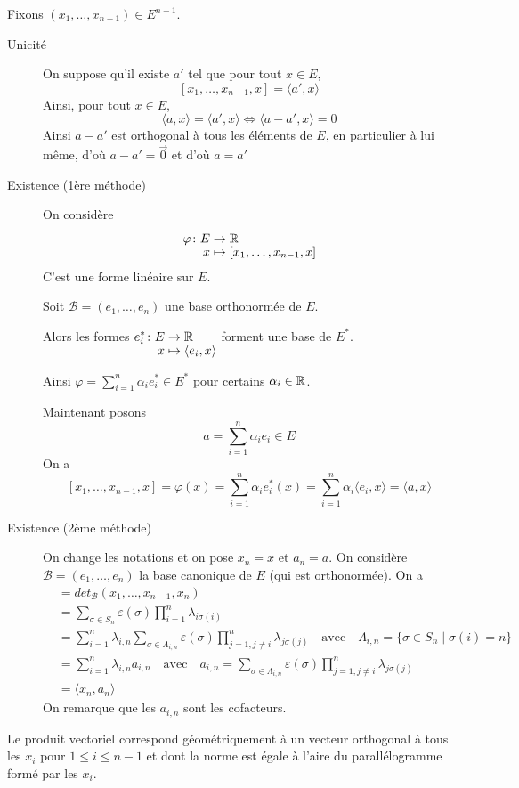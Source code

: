 \documentclass[a4paper, 12pt]{article}
\begin{document}
\begin{demonstration}
    Fixons $(x_1, \dots, x_{n-1}) \in E^{n-1}$.
    \begin{description}
        \item[Unicité]
        On suppose qu'il existe $a'$ tel que pour tout $x \in E$,
        $$
        [x_1, \dots, x_{n-1}, x] = \langle a', x \rangle
        $$
        Ainsi, pour tout $x \in E$,
        $$
        \langle a, x \rangle = \langle a', x \rangle \iff \langle a - a', x \rangle = 0
        $$
        Ainsi $a - a'$ est orthogonal à tous les éléments de $E$, en particulier à lui même, d'où $a - a' = \vec{0}$ et 
        d'où $a = a'$

        \item[Existence (1ère méthode)]
        On considère
        $$
        \funcdef{\varphi}{E}{\R}{x}{[x_1, \dots, x_{n-1}, x]}
        $$
        C'est une forme linéaire sur $E$.

        Soit $\mathcal{B} = (e_1, \dots, e_n)$ une base orthonormée de $E$.

        Alors les formes $\funcdef{e_i^*}{E}{\R}{x}{\langle e_i, x \rangle}$ forment une base de $E^*$.

        Ainsi $\varphi = \sum_{i=1}^n \alpha_i e_i^* \in E^*$ pour certains $\alpha_i \in \mathbb{R}$.

        Maintenant posons
        $$
        a = \sum_{i=1}^n \alpha_i e_i \in E
        $$
        On a
        $$
        [x_1, \dots, x_{n-1}, x] = \varphi(x) = \sum_{i=1}^n \alpha_i e_i^*(x) = \sum_{i=1}^n \alpha_i \langle e_i, x \rangle = \langle a, x \rangle
        $$
        \item[Existence (2ème méthode)]
        On change les notations et on pose $x_n = x$ et $a_n = a$.
        On considère $\mathcal{B} = (e_1, \dots, e_n)$ la base canonique de $E$ (qui est orthonormée).
        On a
        \begin{align*}
            [x_1, \dots, x_{n-1}, x_n] &= det_\mathcal{B}(x_1, \dots, x_{n-1}, x_n) \\
            &= \sum_{\sigma \in S_n} \varepsilon(\sigma) \prod_{i=1}^n \lambda_{i \sigma(i)} \\
            &= \sum_{i=1}^n \lambda_{i, n} \sum_{\sigma \in \Lambda_{i, n}} \varepsilon(\sigma) \prod_{j=1, j \neq i}^n \lambda_{j \sigma(j)} \quad \text{avec} \quad \Lambda_{i, n} = \{ \sigma \in S_n \mid \sigma(i) = n \} \\
            &= \sum_{i=1}^n \lambda_{i, n} a_{i,n} \quad \text{avec} \quad a_{i, n} = \sum_{\sigma \in \Lambda_{i, n}} \varepsilon(\sigma) \prod_{j=1, j \neq i}^n \lambda_{j \sigma(j)} \\
            &= \langle x_n, a_n \rangle
        \end{align*}
        On remarque que les $a_{i, n}$ sont les cofacteurs.
    \end{description}
\end{demonstration}

\begin{remarque}
    Le produit vectoriel correspond géométriquement à un vecteur orthogonal à tous les $x_i$ pour $1 \leq i \leq n-1$ et dont la norme est égale à l'aire du parallélogramme formé par les $x_i$.
\end{remarque}
\end{document}
